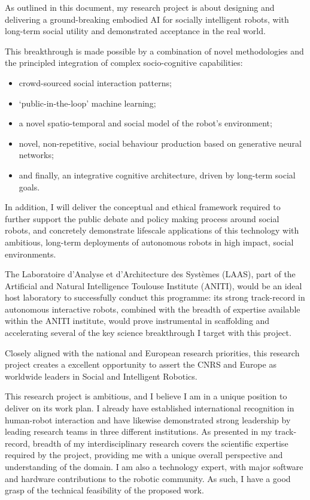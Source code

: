 As outlined in this document, my research project is about designing and
delivering a ground-breaking embodied AI for socially intelligent robots, with
long-term social utility and demonstrated acceptance in the real world.

This breakthrough is made possible by a combination of novel methodologies and
the principled integration of complex socio-cognitive capabilities:

\begin{itemize}
        \item crowd-sourced social interaction patterns;
        \item `public-in-the-loop' machine learning;
        \item a novel spatio-temporal and social model of the robot's environment;
        \item novel, non-repetitive, social behaviour production based on
            generative neural networks;
        \item and finally, an integrative cognitive architecture, driven by
            long-term social goals.
\end{itemize}


In addition, I will deliver the conceptual and ethical framework
required to further support the public debate and policy making process
around social robots, and concretely demonstrate lifescale applications of
this technology with ambitious, long-term deployments of autonomous robots
in high impact, social environments.

The Laboratoire d'Analyse et d'Architecture des Systèmes (LAAS), part
of the Artificial and Natural Intelligence Toulouse Institute (ANITI), would
be an ideal host laboratory to successfully conduct this programme: its
strong track-record in autonomous interactive robots, combined with the breadth
of expertise available within the ANITI institute, would prove instrumental in
scaffolding and accelerating several of the key science breakthrough I target
with this project.

Closely aligned with the national and European research priorities,
this research project creates a excellent opportunity to assert the CNRS and
Europe as worldwide leaders in Social and Intelligent Robotics.


This research project is ambitious, and I believe I am in a unique position to
deliver on its work plan. I already have established international recognition in
human-robot interaction and have likewise demonstrated strong leadership by
leading research teams in three different institutions. As presented in my
track-record, breadth of my interdisciplinary research covers the scientific expertise
required by the project, providing me with a unique overall perspective and
understanding of the domain. I am also a technology expert, with major software
and hardware contributions to the robotic community. As such,
I have a good grasp of the technical feasibility of the proposed work.

